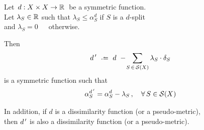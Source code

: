 \documentclass[./main.tex]{subfiles}
\begin{document}
\begin{theorem}[{\cites[Theorem 2]{BD92a}}] \label{teo:teo2}
    Let $\, d : {X \times X} \to \mathbb{R} \,$ be a symmetric function. \\
    Let $\lambda_S \in \R$ such that $\lambda_S \leq \alpha_S^d$ if $S$ is a $d$-split \\
    \phantom{Let $\lambda_S \in \R$ such } and $\lambda_S = 0$\ \ \ otherwise.

    Then
    \[ \dpr \ \defeq\  d \ -\! \sum_{S \,\in\, \Sc(X)} \lambda_S \cdot \delta_S \eqspace{-2pt}{-5pt} \]
    is a symmetric function such that
    \[ \alpha_S^\dpr = \alpha_S^d - \lambda_S \,, \quad \forall\, S \in \Sc(X) \eqspace{2pt}{0pt} \]

    In addition, if $d$ is a dissimilarity function (or a pseudo-metric), \\
    then ${d^{\,\prime}}$ is also a dissimilarity function (or a pseudo-metric).
\end{theorem}
\end{document}
